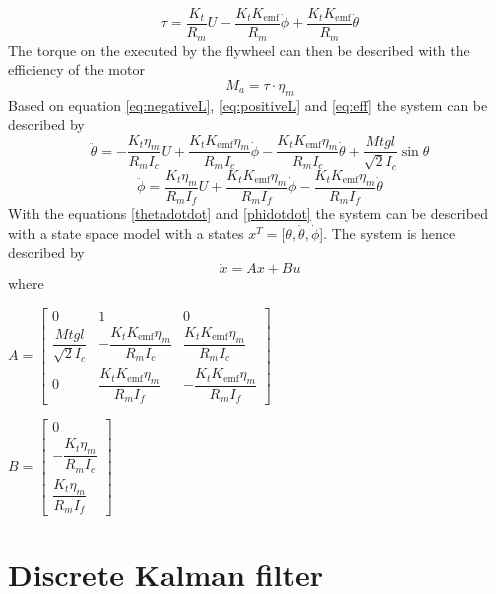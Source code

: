 \documentclass[a4paper,11pt]{kth-mag}
\begin{document}
\begin{equation} \label{eq:tau}
\tau = \frac{K_t}{R_m} U - \frac{K_t K_{\text{emf}} }{R_m} \dot{\phi} + \frac{K_t K_{\text{emf}} }{R_m} \dot{\theta}
\end{equation}
The torque on the executed by the flywheel can then be described with the efficiency of the motor
\begin{equation} \label{eq:eff}
M_a = \tau \cdot \eta_m
\end{equation}
Based on equation \eqref{eq:negativeL}, \eqref{eq:positiveL} and \eqref{eq:eff} the system can be described by
\begin{equation}
\ddot{\theta} = -\frac{K_t \eta_m}{R_m I_c} U + \frac{K_t K_{\text{emf}} \eta_m}{R_m I_c} \dot{\phi} - \frac{K_t K_{\text{emf}} \eta_m}{R_m I_c} \dot{\theta} + \frac{Mt g l }{\sqrt{2} I_c} \sin \theta \label{thetadotdot}
\end{equation}
\begin{equation}
\ddot{\phi} = \frac{K_t \eta_m}{R_m I_f} U + \frac{K_t K_{\text{emf}} \eta_m}{R_m I_f} \dot{\phi} - \frac{K_t K_{\text{emf}} \eta_m}{R_m I_f} \dot{\theta} 
\label{phidotdot}
\end{equation} 
With the equations \eqref{thetadotdot} and \eqref{phidotdot} the system can be described with a state space model with a states $x^T = [\theta, \dot{\theta}, \dot{\phi}$]. The system is hence described by
\begin{equation}
\dot{x} = Ax + Bu
\end{equation} 
where \\
\begin{center}
$A =\begin{bmatrix}
0 & 1 & 0 \\
\dfrac{Mt g l }{\sqrt{2} I_c} & - \dfrac{K_t K_{\text{emf}} \eta_m}{R_m I_c} & \dfrac{K_t K_{\text{emf}} \eta_m}{R_m I_c} \\ 
0 & \dfrac{K_t K_{\text{emf}} \eta_m}{R_m I_f} & -\dfrac{K_t K_{\text{emf}} \eta_m}{R_m I_f}
\end{bmatrix}$

$B = \begin{bmatrix}
0 \\ 
-\dfrac{K_t \eta_m}{R_m I_c} \\
\dfrac{K_t \eta_m}{R_m I_f}
\end{bmatrix} $
\end{center}

\section{Discrete Kalman filter}
\end{document}
